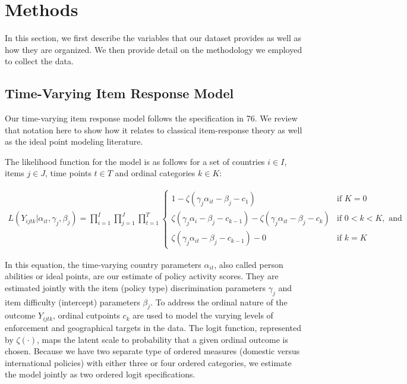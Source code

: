 \documentclass[]{article}
\begin{document}
\hypertarget{methods}{%
\section*{Methods}\label{methods}}

In this section, we first describe the variables that our dataset provides as well as how they are organized. We then provide detail on the methodology we employed to collect the data.

\hypertarget{time-varying-item-response-model}{%
\subsection*{Time-Varying Item Response Model}\label{time-varying-item-response-model}}

Our time-varying item response model follows the specification in 76. We review that notation here to show how it relates to classical item-response theory as well as the ideal point modeling literature.

The likelihood function for the model is as follows for a set of countries \(i \in I\), items \(j \in J\), time points \(t \in T\) and ordinal categories \(k \in K\):

\begin{align}
    L(Y_{ijtk}|\alpha_{it},\gamma_j,\beta_j) =  \prod_{i=1}^{I} \prod_{j=1}^{J} \prod_{t=1}^{T}
    \begin{cases} 
    1 -  \zeta(\gamma_j \alpha_{it} - \beta_j - c_1) & \text{if } K = 0 \\
    \zeta(\gamma_j \alpha_i - \beta_j - c_{k-1}) - \zeta(\gamma_j \alpha_{it} - \beta_j - c_{k})       & \text{if } 0 < k < K, \text{ and} \\
    \zeta(\gamma_j \alpha_{it} - \beta_j - c_{k-1}) - 0 & \text{if } k=K
    \end{cases}
\label{eq:basic}
\end{align}

In this equation, the time-varying country parameters \(\alpha_{it}\), also called person abilities or ideal points, are our estimate of policy activity scores. They are estimated jointly with the item (policy type) discrimination parameters \(\gamma_j\) and item difficulty (intercept) parameters \(\beta_j\). To address the ordinal nature of the outcome \(Y_{ijtk}\), ordinal cutpoints \(c_{k}\) are used to model the varying levels of enforcement and geographical targets in the data. The logit function, represented by \(\zeta(\cdot)\), maps the latent scale to probability that a given ordinal outcome is chosen. Because we have two separate type of ordered measures (domestic versus international policies) with either three or four ordered categories, we estimate the model jointly as two ordered logit specifications.
\end{document}
